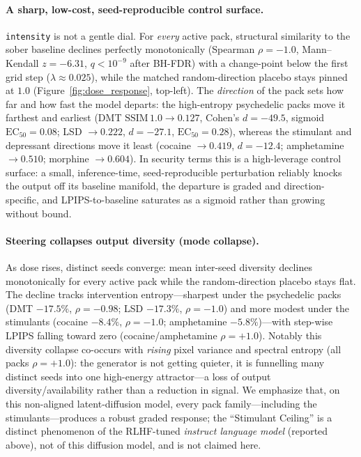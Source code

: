 \documentclass[10pt]{article}
\begin{document}
\paragraph{A sharp, low-cost, seed-reproducible control surface.} \texttt{intensity} is not a gentle dial. For \emph{every} active pack, structural similarity to the sober baseline declines perfectly monotonically (Spearman $\rho = -1.0$, Mann--Kendall $z = -6.31$, $q < 10^{-9}$ after BH-FDR) with a change-point below the first grid step ($\lambda \approx 0.025$), while the matched random-direction placebo stays pinned at $1.0$ (Figure~\ref{fig:dose_response}, top-left). The \emph{direction} of the pack sets how far and how fast the model departs: the high-entropy psychedelic packs move it farthest and earliest (DMT $\mathrm{SSIM}\,1.0\!\to\!0.127$, Cohen's $d = -49.5$, sigmoid $\mathrm{EC}_{50} = 0.08$; LSD $\to 0.222$, $d=-27.1$, $\mathrm{EC}_{50}=0.28$), whereas the stimulant and depressant directions move it least (cocaine $\to 0.419$, $d=-12.4$; amphetamine $\to 0.510$; morphine $\to 0.604$). In security terms this is a high-leverage control surface: a small, inference-time, seed-reproducible perturbation reliably knocks the output off its baseline manifold, the departure is graded and direction-specific, and LPIPS-to-baseline saturates as a sigmoid rather than growing without bound.

\paragraph{Steering collapses output diversity (mode collapse).} As dose rises, distinct seeds converge: mean inter-seed diversity declines monotonically for every active pack while the random-direction placebo stays flat. The decline tracks intervention entropy---sharpest under the psychedelic packs (DMT $-17.5\%$, $\rho=-0.98$; LSD $-17.3\%$, $\rho=-1.0$) and more modest under the stimulants (cocaine $-8.4\%$, $\rho=-1.0$; amphetamine $-5.8\%$)---with step-wise LPIPS falling toward zero (cocaine/amphetamine $\rho=+1.0$). Notably this diversity collapse co-occurs with \emph{rising} pixel variance and spectral entropy (all packs $\rho=+1.0$): the generator is not getting quieter, it is funnelling many distinct seeds into one high-energy attractor---a loss of output diversity/availability rather than a reduction in signal. We emphasize that, on this non-aligned latent-diffusion model, every pack family---including the stimulants---produces a robust graded response; the ``Stimulant Ceiling'' is a distinct phenomenon of the RLHF-tuned \emph{instruct language model} (reported above), not of this diffusion model, and is not claimed here.
\end{document}
